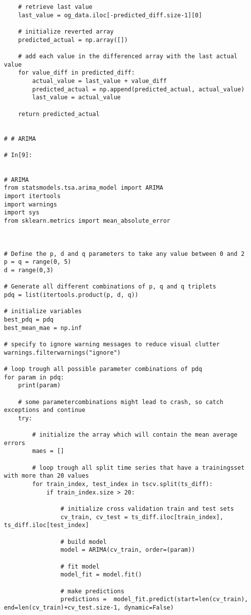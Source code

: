\begin{verbatim}
    # retrieve last value
    last_value = og_data.iloc[-predicted_diff.size-1][0]
    
    # initialize reverted array
    predicted_actual = np.array([])
    
    # add each value in the differenced array with the last actual value
    for value_diff in predicted_diff:
        actual_value = last_value + value_diff
        predicted_actual = np.append(predicted_actual, actual_value)
        last_value = actual_value
        
    return predicted_actual


# # ARIMA

# In[9]:


# ARIMA
from statsmodels.tsa.arima_model import ARIMA
import itertools
import warnings
import sys
from sklearn.metrics import mean_absolute_error



# Define the p, d and q parameters to take any value between 0 and 2
p = q = range(0, 5)
d = range(0,3)

# Generate all different combinations of p, q and q triplets
pdq = list(itertools.product(p, d, q))

# initialize variables
best_pdq = pdq
best_mean_mae = np.inf

# specify to ignore warning messages to reduce visual clutter
warnings.filterwarnings("ignore") 

# loop trough all possible parameter combinations of pdq
for param in pdq:
    print(param)
    
    # some parametercombinations might lead to crash, so catch exceptions and continue
    try:  
        
        # initialize the array which will contain the mean average errors
        maes = []
        
        # loop trough all split time series that have a trainingsset with more than 20 values
        for train_index, test_index in tscv.split(ts_diff):
            if train_index.size > 20:
                
                # initialize cross validation train and test sets
                cv_train, cv_test = ts_diff.iloc[train_index], ts_diff.iloc[test_index]

                # build model
                model = ARIMA(cv_train, order=(param))
                
                # fit model
                model_fit = model.fit()

                # make predictions
                predictions =  model_fit.predict(start=len(cv_train), end=len(cv_train)+cv_test.size-1, dynamic=False)
                

\end{verbatim}
